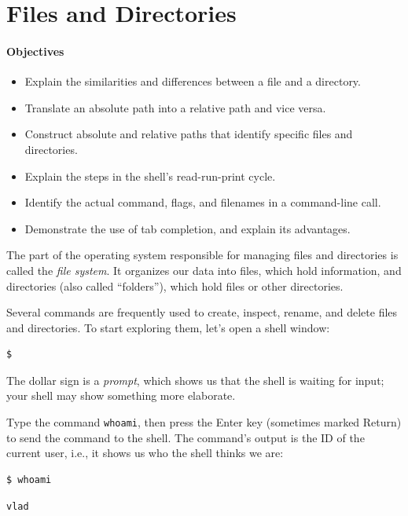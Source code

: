 \documentclass[]{book}
\newcommand{\gdef}[2]{\emph{#2}}
\begin{document}
\section{Files and Directories}

\mbox{}\paragraph{Objectives}

\begin{itemize}
\item
  Explain the similarities and differences between a file and a
  directory.
\item
  Translate an absolute path into a relative path and vice versa.
\item
  Construct absolute and relative paths that identify specific files and
  directories.
\item
  Explain the steps in the shell's read-run-print cycle.
\item
  Identify the actual command, flags, and filenames in a command-line
  call.
\item
  Demonstrate the use of tab completion, and explain its advantages.
\end{itemize}

The part of the operating system responsible for managing files and
directories is called the \gdef{g:filesystem}{file system}. It
organizes our data into files, which hold information, and directories
(also called ``folders''), which hold files or other directories.

Several commands are frequently used to create, inspect, rename, and
delete files and directories. To start exploring them, let's open a
shell window:

\begin{verbatim}
$
\end{verbatim}

The dollar sign is a \gdef{g:prompt}{prompt}, which shows us that
the shell is waiting for input; your shell may show something more
elaborate.

Type the command \texttt{whoami}, then press the Enter key (sometimes
marked Return) to send the command to the shell. The command's output is
the ID of the current user, i.e., it shows us who the shell thinks we
are:

\begin{verbatim}
$ whoami
\end{verbatim}

\begin{verbatim}
vlad
\end{verbatim}
\end{document}
